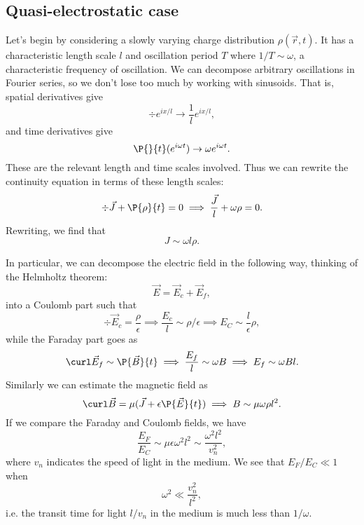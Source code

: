 \subsection*{Quasi-electrostatic case}
Let's begin by considering a slowly varying charge distribution $\rho(\vec r, t)$. It has a characteristic length scale $l$ and oscillation period $T$ where $1/T \sim \omega$, a characteristic frequency of oscillation. We can decompose arbitrary oscillations in Fourier series, so we don't lose too much by working with sinusoids. That is, spatial derivatives give
\begin{equation}
    \div e^{ix/l} \to \frac{1}{l} e^{ix/l},
\end{equation}
and time derivatives give
\begin{equation}
    \P{}{t} (e^{i\omega t}) \to \omega e^{i\omega t}.
\end{equation}
These are the relevant length and time scales involved. Thus we can rewrite the continuity equation in terms of these length scales:
\begin{equation}
    \div \vec J + \P{\rho}{t} = 0 \implies \frac{\vec J}{l} + \omega \rho =0.
\end{equation}
Rewriting, we find that
\begin{equation}
    J \sim \omega l \rho.
\end{equation}

In particular, we can decompose the electric field in the following way, thinking of the Helmholtz theorem:
\begin{equation}
    \vec E = \vec E_c + \vec E_f,
\end{equation}
into a Coulomb part such that
\begin{equation}
    \div \vec E_c = \frac{\rho}{\epsilon} \implies \frac{E_c}{l} \sim \rho/\epsilon \implies E_C \sim \frac{l}{\epsilon}\rho,
\end{equation}
while the Faraday part goes as
\begin{equation}
    \curl \vec E_f \sim \P{\vec B}{t} \implies \frac{E_f}{l} \sim \omega B \implies E_f \sim \omega Bl.
\end{equation}
Similarly we can estimate the magnetic field as
\begin{equation}
    \curl \vec B = \mu(\vec J + \epsilon \P{\vec E}{t}) \implies B \sim \mu \omega \rho l^2.
\end{equation}
If we compare the Faraday and Coulomb fields, we have
\begin{equation}
    \frac{E_F}{E_C} \sim \mu \epsilon \omega^2 l^2 \sim \frac{\omega^2 l^2}{v_n^2},
\end{equation}
where $v_n$ indicates the speed of light in the medium. We see that $E_F/E_C \ll 1$ when
\begin{equation}
    \omega^2 \ll \frac{v_n^2}{l^2},
\end{equation}
i.e. the transit time for light $l/v_n$ in the medium is much less than $1/\omega$.


